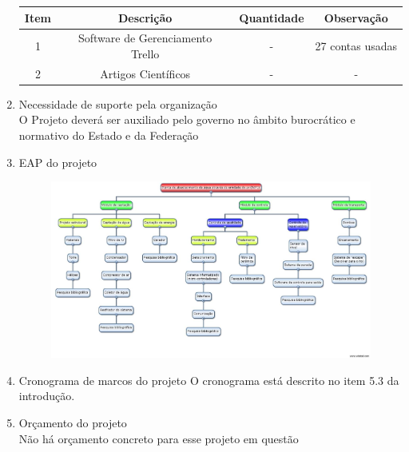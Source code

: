 \begin{enumerate}
\begin{table}[!ht]
\begin{tabular}{|c|c|c|c|}
Item & Descrição & Quantidade & Observação\\ \hline
1 & Software de Gerenciamento Trello & - & 27 contas usadas\\ \hline
2 & Artigos Científicos & - & - \\ \hline

\end{tabular}
\end{table}
\FloatBarrier

\item Necessidade de suporte pela organização\\
O Projeto deverá ser auxiliado pelo governo no âmbito burocrático e normativo do Estado e da Federação

\item EAP do projeto
\begin{figure}[h]
\centering
\includegraphics[scale=0.3]{editaveis/figuras/EAP}
\end{figure}
\FloatBarrier

\item Cronograma de marcos do projeto
O cronograma está descrito no item 5.3 da introdução.

\item Orçamento do projeto\\
Não há orçamento concreto para esse projeto em questão

\end{enumerate}
